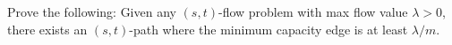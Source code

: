 \documentclass{article}
\begin{document}
\begin{solution}

\end{solution}
\pagebreak

\begin{subexercise}
  Prove the following: Given any \( (s, t) \)-flow problem with max flow value \( \lambda > 0 \), there exists an \( (s, t) \)-path where the minimum capacity edge is at least \( \lambda/m \).
\end{subexercise}

\begin{solution}

\end{solution}
\pagebreak
\end{document}
